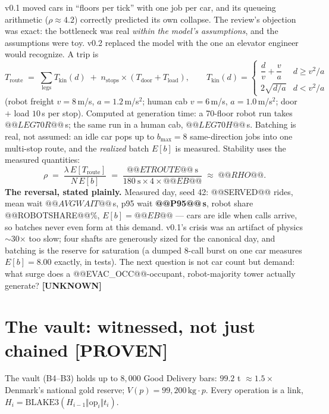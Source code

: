 \documentclass[11pt,a4paper]{article}
\newcommand{\claim}[1]{\textcolor{qsteel}{\textbf{\footnotesize[#1]}}}
\begin{document}
v0.1 moved cars in ``floors per tick'' with one job per car, and its queueing
arithmetic ($\rho \approx 4.2$) correctly predicted its own collapse. The review's
objection was exact: the bottleneck was real \emph{within the model's assumptions},
and the assumptions were toy. v0.2 replaced the model with the one an elevator
engineer would recognize. A trip is
\[
T_{\text{route}} \;=\; \sum_{\text{legs}} T_{\text{kin}}(d)
\;+\; n_{\text{stops}} \times (T_{\text{door}} + T_{\text{load}}),
\qquad
T_{\text{kin}}(d) =
\begin{cases}
\dfrac{d}{v} + \dfrac{v}{a} & d \geq v^2/a \\[8pt]
2\sqrt{d/a} & d < v^2/a
\end{cases}
\]
(robot freight $v=8$\,m/s, $a=1.2$\,m/s$^2$; human cab $v=6$\,m/s, $a=1.0$\,m/s$^2$;
door $+$ load $10$\,s per stop). Computed at generation time: a 70-floor robot run
takes $@@LEG70R@@$\,s; the same run in a human cab, $@@LEG70H@@$\,s. Batching is
real, not assumed: an idle car pops up to $b_{\max}=8$ same-direction jobs into one
multi-stop route, and the \emph{realized} batch $E[b]$ is measured. Stability uses
the measured quantities:
\[
\rho \;=\; \frac{\lambda\, E[T_{\text{route}}]}{N\, E[b]}
\;=\; \frac{@@ETROUTE@@\ \text{s}}{180\ \text{s} \times 4 \times @@EB@@}
\;\approx\; @@RHO@@ .
\]
\textbf{The reversal, stated plainly.} Measured day, seed 42: @@SERVED@@ rides,
mean wait $@@AVGWAIT@@$\,s, p95 wait \textbf{@@P95@@\,s}, robot share
@@ROBOTSHARE@@\%, $E[b] = @@EB@@$ --- cars are idle when calls arrive, so batches
never even form at this demand. v0.1's crisis was an artifact of physics
$\sim$30$\times$ too slow; four shafts are generously sized for the canonical day,
and batching is the reserve for saturation (a dumped 8-call burst on one car
measures $E[b]=8.00$ exactly, in tests). The next question is not car count but
demand: what surge does a @@EVAC_OCC@@-occupant, robot-majority tower actually
generate? \claim{UNKNOWN}

\section{The vault: witnessed, not just chained \hfill \claim{PROVEN}}

The vault (B4--B3) holds up to $8{,}000$ Good Delivery bars:
$99.2$ t $\approx 1.5\times$ Denmark's national gold reserve;
$V(p) = 99{,}200\,\text{kg} \cdot p$. Every operation is a link,
$H_i = \mathrm{BLAKE3}(H_{i-1} \Vert \mathrm{op}_i \Vert t_i)$.
\end{document}
